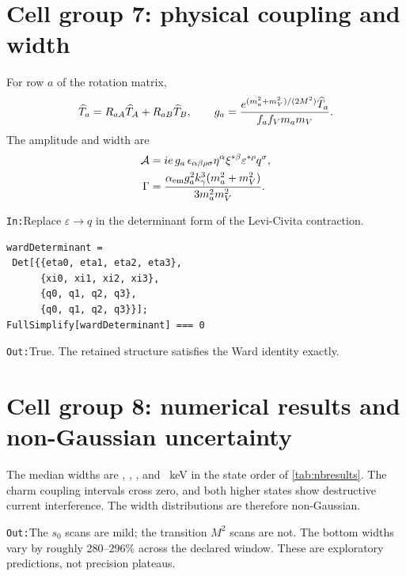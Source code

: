 \documentclass[10pt,a4paper]{article}
\newcommand{\InputCell}[1]{%
  \par\medskip\noindent\colorbox{cellblue}{%
  \parbox{\dimexpr\linewidth-2\fboxsep}{\texttt{In:}\quad #1}}\par\smallskip}
\newcommand{\OutputCell}[1]{%
  \par\smallskip\noindent\colorbox{outputgray}{%
  \parbox{\dimexpr\linewidth-2\fboxsep}{\texttt{Out:}\quad #1}}\par\medskip}
\begin{document}
\section{Cell group 7: physical coupling and width}

For row $a$ of the rotation matrix,
\begin{equation}
\widehat T_a=R_{aA}\widehat T_A+R_{aB}\widehat T_B,\qquad
g_a={e^{(m_a^2+m_V^2)/(2M^2)}\widehat T_a
\over f_af_Vm_am_V}.
\end{equation}
The amplitude and width are
\begin{align}
{\cal A}&=ie\,g_a\,\epsilon_{\alpha\beta\rho\sigma}
\eta^\alpha\xi^{*\beta}\varepsilon^{*\rho}q^\sigma,\\
\Gamma&={\alpha_{\rm em}g_a^2k_\gamma^3(m_a^2+m_V^2)
\over3m_a^2m_V^2}.
\end{align}
\InputCell{Replace $\varepsilon\to q$ in the determinant form of the
Levi-Civita contraction.}
\begin{lstlisting}
wardDeterminant =
 Det[{{eta0, eta1, eta2, eta3},
      {xi0, xi1, xi2, xi3},
      {q0, q1, q2, q3},
      {q0, q1, q2, q3}}];
FullSimplify[wardDeterminant] === 0
\end{lstlisting}
\OutputCell{True.  The retained structure satisfies the Ward identity
exactly.}

\section{Cell group 8: numerical results and non-Gaussian uncertainty}

\begin{table}[H]
\centering\small
\resizebox{\textwidth}{!}{}
\caption{Medians and 16th--84th percentiles from 1200 accepted samples per
state.}
\label{tab:nbresults}
\end{table}

The median widths are \DsLowWidth, \DsHighWidth, \BsLowWidth, and
\BsHighWidth\ keV in the state order of \cref{tab:nbresults}.  The charm
coupling intervals cross zero, and both higher states show destructive
current interference.  The width distributions are therefore non-Gaussian.

\begin{table}[H]
\centering\small

\caption{Full-range relative variation $(\max-\min)/|\mathrm{mean}|$.}
\end{table}
\OutputCell{The $s_0$ scans are mild; the transition $M^2$ scans are not.
The bottom widths vary by roughly 280--296\% across the declared window.
These are exploratory predictions, not precision plateaus.}
\end{document}
